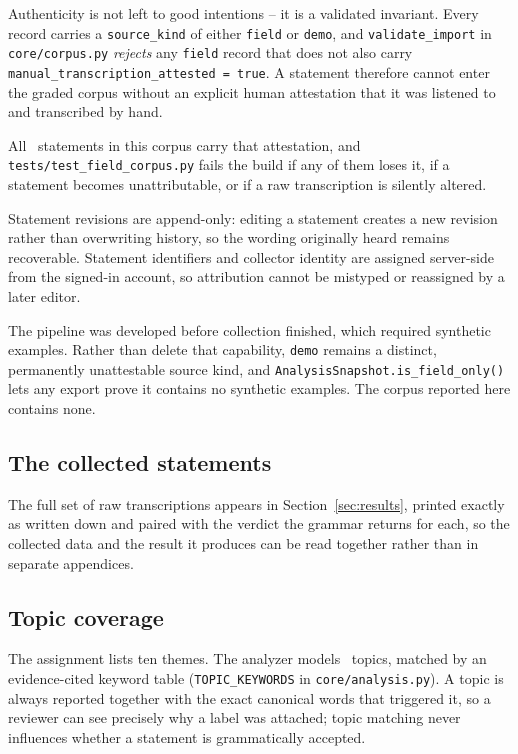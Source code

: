 Authenticity is not left to good intentions -- it is a validated invariant. Every record
carries a \texttt{source\_kind} of either \texttt{field} or \texttt{demo}, and
\texttt{validate\_import} in \texttt{core/corpus.py} \emph{rejects} any \texttt{field}
record that does not also carry \texttt{manual\_transcription\_attested = true}. A
statement therefore cannot enter the graded corpus without an explicit human attestation
that it was listened to and transcribed by hand.

All \CorpusAttested\ statements in this corpus carry that attestation, and
\texttt{tests/test\_field\_corpus.py} fails the build if any of them loses it, if a
statement becomes unattributable, or if a raw transcription is silently altered.

Statement revisions are append-only: editing a statement creates a new revision rather
than overwriting history, so the wording originally heard remains recoverable. Statement
identifiers and collector identity are assigned server-side from the signed-in account, so
attribution cannot be mistyped or reassigned by a later editor.

\begin{keypoint}
The pipeline was developed before collection finished, which required synthetic examples.
Rather than delete that capability, \texttt{demo} remains a distinct, permanently
unattestable source kind, and \texttt{AnalysisSnapshot.is\_field\_only()} lets any export
prove it contains no synthetic examples. The corpus reported here contains none.
\end{keypoint}

\subsection{The collected statements}

The full set of raw transcriptions appears in Section~\ref{sec:results}, printed exactly as
written down and paired with the verdict the grammar returns for each, so the collected
data and the result it produces can be read together rather than in separate appendices.

\subsection{Topic coverage}

The assignment lists ten themes. The analyzer models \TopicCount\ topics, matched by an
evidence-cited keyword table (\texttt{TOPIC\_KEYWORDS} in \texttt{core/analysis.py}). A
topic is always reported together with the exact canonical words that triggered it, so a
reviewer can see precisely why a label was attached; topic matching never influences
whether a statement is grammatically accepted.

